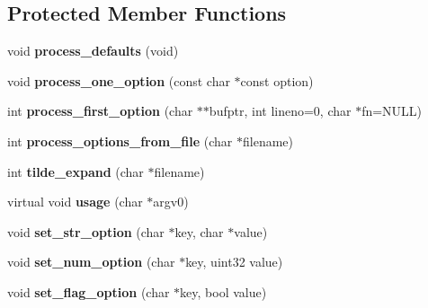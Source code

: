 \subsection*{Protected Member Functions}
\begin{DoxyCompactItemize}
\item 
\hypertarget{classOptions_a5b2d7759ab32fe3a5c638a18862a0e54}{
void {\bfseries process\_\-defaults} (void)}
\label{classOptions_a5b2d7759ab32fe3a5c638a18862a0e54}

\item 
\hypertarget{classOptions_ad8ec1474331ba97df748a9ceaf1f48a6}{
void {\bfseries process\_\-one\_\-option} (const char $\ast$const option)}
\label{classOptions_ad8ec1474331ba97df748a9ceaf1f48a6}

\item 
\hypertarget{classOptions_a76a5fec3abf24dd992b76e6056392604}{
int {\bfseries process\_\-first\_\-option} (char $\ast$$\ast$bufptr, int lineno=0, char $\ast$fn=NULL)}
\label{classOptions_a76a5fec3abf24dd992b76e6056392604}

\item 
\hypertarget{classOptions_a06b815b611cffcd3ee17fdaeb1787854}{
int {\bfseries process\_\-options\_\-from\_\-file} (char $\ast$filename)}
\label{classOptions_a06b815b611cffcd3ee17fdaeb1787854}

\item 
\hypertarget{classOptions_af82c0bbc02cb2c8f6a115dd1fdd43579}{
int {\bfseries tilde\_\-expand} (char $\ast$filename)}
\label{classOptions_af82c0bbc02cb2c8f6a115dd1fdd43579}

\item 
\hypertarget{classOptions_a50a9e19f3ff310d8d483dc74d4442a87}{
virtual void {\bfseries usage} (char $\ast$argv0)}
\label{classOptions_a50a9e19f3ff310d8d483dc74d4442a87}

\item 
\hypertarget{classOptions_a6e6c73b2ed51467f7f076638e0726629}{
void {\bfseries set\_\-str\_\-option} (char $\ast$key, char $\ast$value)}
\label{classOptions_a6e6c73b2ed51467f7f076638e0726629}

\item 
\hypertarget{classOptions_ab7f5346ac22e0c72eafb3324fd84236e}{
void {\bfseries set\_\-num\_\-option} (char $\ast$key, uint32 value)}
\label{classOptions_ab7f5346ac22e0c72eafb3324fd84236e}

\item 
\hypertarget{classOptions_a89174e246a138fd030eed58a2ca2f358}{
void {\bfseries set\_\-flag\_\-option} (char $\ast$key, bool value)}
\label{classOptions_a89174e246a138fd030eed58a2ca2f358}


\end{DoxyCompactItemize}

